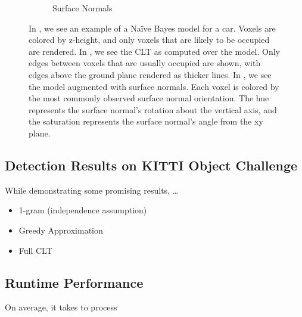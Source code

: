 \begin{figure}
\begin{subfigure}[]{0.3\linewidth}
    \caption{Surface Normals}
    \label{fig:sn}
  \end{subfigure}
  \caption{In , we see an example of a Na\"ive Bayes model for a
    car. Voxels are colored by z-height, and only voxels that are likely to be
    occupied are rendered. In , we see the \ac{CLT} as computed
    over the model. Only edges between voxels that are usually occupied are
    shown, with edges above the ground plane rendered as thicker lines. In
    , we see the model augmented with surface normals. Each voxel
    is colored by the most commonly observed surface normal orientation. The hue
    represents the surface normal's rotation about the vertical axis, and the
    saturation represents the surface normal's angle from the xy plane.}
  \label{fig:models}
\end{figure}

\subsection{Detection Results on KITTI Object Challenge}

While demonstrating some promising results, \ldots

\begin{itemize}
  \item 1-gram (independence assumption)
  \item Greedy Approximation
  \item Full \ac{CLT}
\end{itemize}

\subsection{Runtime Performance}

On average, it takes  to process 
